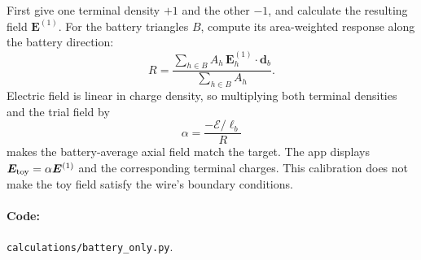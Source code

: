 \documentclass[11pt]{article}
\begin{document}
First give one terminal density $+1$ and the other $-1$, and
calculate the resulting field $\bm E^{(1)}$. For the battery
triangles $B$, compute its area-weighted response along the
battery direction:
\begin{equation}
 R=\frac{\sum_{h\in B}A_h\,
                  \bm E_h^{(1)}\cdot\bm d_b}
         {\sum_{h\in B}A_h}.
\end{equation}
Electric field is linear in charge density, so multiplying both
terminal densities and the trial field by
\begin{equation}
 \alpha=\frac{-\mathcal E/\ell_b}{R}
\end{equation}
makes the battery-average axial field match the target.
The app displays $\bm E_{\rm toy}=\alpha\bm E^{(1)}$ and
the corresponding terminal charges. This calibration does not
make the toy field satisfy the wire's boundary conditions.

\paragraph{Code:} \texttt{calculations/battery\_only.py}.
\end{document}
